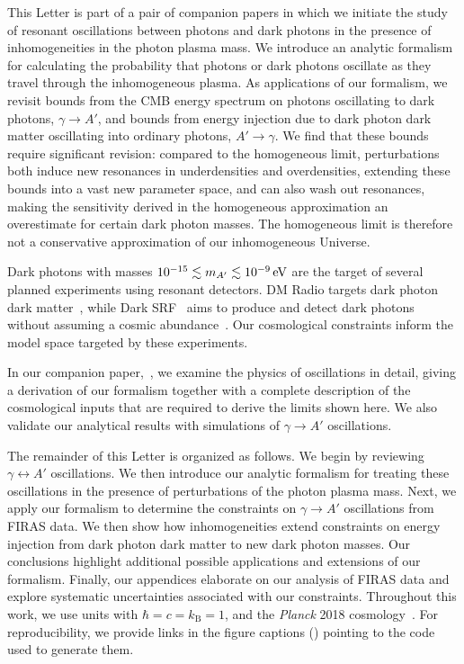 \documentclass[prd,aps,10pt,nofootinbib,twocolumn,superscriptaddress,preprintnumbers,balancelastpage,longbibliography]{revtex4-1}
\begin{document}
This Letter is part of a pair of companion papers in which we initiate the study of resonant oscillations between photons and dark photons in the presence of inhomogeneities in the photon plasma mass.  We introduce an analytic formalism for calculating the probability that photons or dark photons oscillate as they travel through the inhomogeneous plasma.  As applications of our formalism, we revisit bounds from the CMB energy spectrum on photons oscillating to dark photons, $\gamma \rightarrow A'$, and bounds from energy injection due to dark photon dark matter oscillating into ordinary photons, $A' \rightarrow \gamma $.  We find that these bounds require significant revision: compared to the homogeneous limit, perturbations both induce new resonances in underdensities and overdensities, extending these bounds into a vast new parameter space, and can also wash out resonances, making the sensitivity derived in the homogeneous approximation an overestimate for certain dark photon masses. The homogeneous limit is therefore not a conservative approximation of our inhomogeneous Universe.

Dark photons with masses $10^{-15} \lesssim \mAp \lesssim \SI{e-9}{\eV}$ are the target of several planned experiments using resonant detectors. DM Radio targets dark photon dark matter~\cite{Chaudhuri:2014dla,Silva-Feaver:2016qhh}, while Dark SRF~\cite{HarnikSRF,GrassellinoSRF} aims to produce and detect dark photons without assuming a cosmic abundance~\cite{Graham:2014sha}. Our cosmological constraints  inform the model space targeted by these experiments.

In our companion paper,~, we examine the physics of oscillations in detail, giving a derivation of our formalism together with a complete description of the cosmological inputs that are required to derive the limits shown here. We also validate our analytical results with simulations of $\gamma \to A'$ oscillations.

The remainder of this Letter is organized as follows.  We begin by reviewing $\gamma \leftrightarrow A'$ oscillations.  We then introduce our analytic formalism for treating these oscillations in the presence of perturbations of the photon plasma mass.  Next, we apply our formalism to determine the constraints on $\gamma \rightarrow A'$ oscillations from FIRAS data.  We then show how inhomogeneities extend constraints on energy injection from dark photon dark matter to new dark photon masses.  Our conclusions highlight additional possible applications and extensions of our formalism. Finally, our appendices elaborate on our analysis of FIRAS data and explore systematic uncertainties associated with our constraints. Throughout this work, we use units with $\hbar = c = k_\mathrm{B} = 1$, and the \textit{Planck} 2018 cosmology~\cite{Aghanim:2019ame}. For reproducibility, we provide links in the figure captions (\nbicon) pointing to the code used to generate them.
\end{document}
